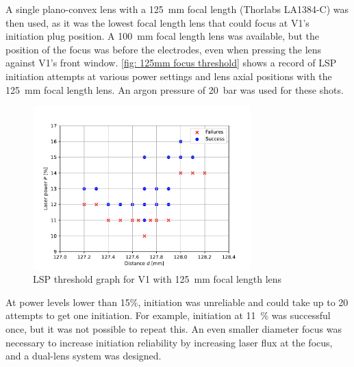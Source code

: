             A single plano-convex lens with a \qty{125}{mm} focal length (Thorlabs LA1384-C) was then used, as it was the lowest focal length lens that could focus at V1's initiation plug position. A \qty{100}{mm} focal length lens was available, but the position of the focus was before the electrodes, even when pressing the lens against V1's front window. \autoref{fig: 125mm focus threshold} shows a record of LSP initiation attempts at various power settings and lens axial positions with the \qty{125}{mm} focal length lens. An argon pressure of \qty{20}{bar} was used for these shots.
            \begin{figure}[!ht]
                \centering
                \includegraphics[width=0.75\textwidth]{assets/4 experiments/125mm_focus_threshold.pdf}
                \caption{LSP threshold graph for V1 with \qty{125}{mm} focal length lens}
                \label{fig: 125mm focus threshold}
            \end{figure}
            At power levels lower than 15\%, initiation was unreliable and could take up to 20 attempts to get one initiation. For example, initiation at \qty{11}{\%} was successful once, but it was not possible to repeat this. An even smaller diameter focus was necessary to increase initiation reliability by increasing laser flux at the focus, and a dual-lens system was designed.

